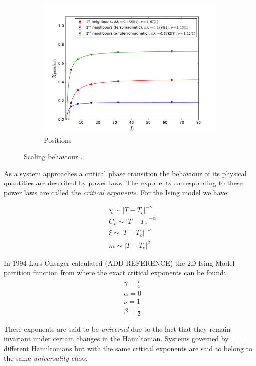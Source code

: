 \documentclass[twoside]{article}
\begin{document}
\begin{multicols}{2}
\begin{figure}[!tpb]
    \begin{subfigure}[b]{0.32\textwidth}
    \includegraphics[width=\textwidth]{images/plot_pos.pdf}
    \caption{Positions}
    \label{scaling_pos}
  \end{subfigure}
  \caption{Scaling behaviour .}
  \label{scaling}
\end{figure}

As a system approaches a critical phase transition the behaviour of its physical quantities are described by power laws. The exponents corresponding to these power laws are called the \emph{critical exponents}. For the Ising model we have:

\begin{align}
&\chi \sim |T-T_c|^{-\gamma} \\
& C_v \sim |T-T_c|^{-\alpha} \\
& \xi \sim |T-T_c|^{-\nu} \\
& m \sim |T-T_c|^{\beta}
\end{align}

In 1994  Lars Onsager calculated (ADD REFERENCE) the 2D Ising Model partition function from where the exact critical exponents can be found:
\begin{align}
&\gamma = \frac{7}{4} \\
&\alpha = 0 \\
&\nu = 1\\
&\beta = \frac{1}{2} 
\end{align}

These exponents are said to be \emph{universal} due to the fact that they remain invariant under certain changes in the Hamiltonian. Systems governed by different Hamiltonians but with the same critical exponents are said to belong to the same \emph{universality class}. 


\end{multicols}
\end{document}
